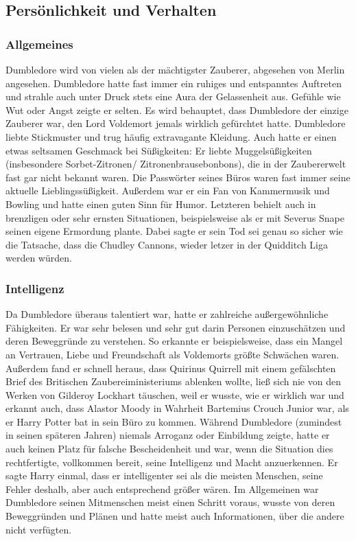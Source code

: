 \documentclass[a4paper, 10pt]{article}
\begin{document}
\subsection*{\Large Persönlichkeit und Verhalten}
\subsubsection*{\large Allgemeines}
Dumbledore wird von vielen als der mächtigster Zauberer, abgesehen von Merlin angesehen. Dumbledore hatte fast immer ein ruhiges und entspanntes Auftreten und strahle auch unter Druck stets eine Aura der Gelassenheit aus. Gefühle wie Wut oder Angst zeigte er selten. Es wird behauptet, dass Dumbledore der einzige Zauberer war, den Lord Voldemort jemals wirklich gefürchtet hatte.
\vspace{10pt}
\newline
{}  
Dumbledore liebte Stickmuster und trug häufig extravagante Kleidung. Auch hatte er einen etwas seltsamen Geschmack bei Süßigkeiten: Er liebte Muggelsüßigkeiten (insbesondere Sorbet-Zitronen/ Zitronenbrausebonbons), die in der Zaubererwelt fast gar nicht bekannt waren. Die Passwörter seines Büros waren fast immer seine aktuelle Lieblingssüßigkeit. Außerdem war er ein Fan von Kammermusik und Bowling und hatte einen guten Sinn für Humor. Letzteren behielt auch in brenzligen oder sehr ernsten Situationen, beispielsweise als er mit Severus Snape seinen eigene Ermordung plante. Dabei sagte er sein Tod sei genau so sicher wie die Tatsache, dass die Chudley Cannons, wieder letzer in der Quidditch Liga werden würden.
\subsubsection*{\large Intelligenz}
Da Dumbledore überaus talentiert war, hatte er zahlreiche außergewöhnliche Fähigkeiten. Er war sehr belesen und sehr gut darin Personen einzuschätzen und deren Beweggründe zu verstehen. So erkannte er beispielsweise, dass ein Mangel an Vertrauen, Liebe und Freundschaft als Voldemorts größte Schwächen waren. Außerdem fand er schnell heraus, dass Quirinus Quirrell mit einem gefälschten Brief des Britischen Zaubereiministeriums ablenken wollte, ließ sich nie von den Werken von Gilderoy Lockhart täuschen, weil er wusste, wie er wirklich war und erkannt auch, dass Alastor Moody in Wahrheit Bartemius Crouch Junior war, als er Harry Potter bat in sein Büro zu kommen.
\vspace{10pt}
\newline
{}  
Während Dumbledore (zumindest in seinen späteren Jahren) niemals Arroganz oder Einbildung zeigte, hatte er auch keinen Platz für falsche Bescheidenheit und war, wenn die Situation dies rechtfertigte, vollkommen bereit, seine Intelligenz und Macht anzuerkennen. Er sagte Harry einmal, dass er intelligenter sei als die meisten Menschen, seine Fehler deshalb, aber auch entsprechend größer wären.
\vspace{10pt}
\newline
{}  
Im Allgemeinen war Dumbledore seinen Mitmenschen meist einen Schritt voraus, wusste von deren Beweggründen und Plänen und hatte meist auch Informationen, über die andere nicht verfügten.
\end{document}
